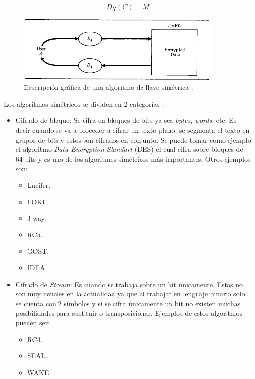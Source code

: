 \begin{equation}\label{eqDescifradoSimetrico}
D_K (C) = M
\end{equation}


\begin{figure}
	\centering
	\includegraphics[width=0.9\textwidth]{./images/figSimmetricKeyAlgorithm}
	\caption{Descripción gráfica de una algoritmo de llave simétrica \citep{denning}.}
	\label{figSimmetricKeyAlgorithm}
\end{figure}


Los algoritmos simétricos se dividen en 2 categorías \citep{bruce}:

\begin{itemize}
\item Cifrado de bloque: Se cifra en bloques de bits ya sea \textit{bytes, words}, etc. Es decir cuando se va a proceder a cifrar un texto plano, se segmenta el texto en grupos de bits y estos son cifrados en conjunto. Se puede tomar como ejemplo el algoritmo \textit{Data Encryption Standart} (DES) el cual cifra sobre bloques de 64 bits y es uno de los algoritmos simétricos más importantes. Otros ejemplos son:
\begin{itemize}
\item Lucifer.
\item LOKI.
\item 3-way.
\item RC5.
\item GOST.
\item IDEA.
\end{itemize}

\item Cifrado de \textit{Stream}: Es cuando se trabaja sobre un bit únicamente. Estos no son muy usuales en la actualidad ya que al trabajar en lenguaje binario solo se cuenta con 2 símbolos y si se cifra únicamente un bit no existen muchas posibilidades para sustituir o transposicionar.
Ejemplos de estos algoritmos pueden ser:
\begin{itemize}
\item RC4.
\item SEAL.
\item WAKE.
\end{itemize}
\end{itemize}

